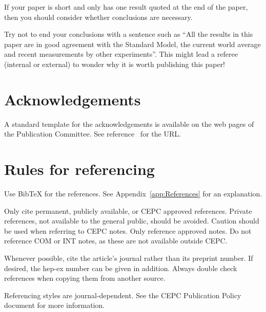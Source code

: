 \documentclass[11pt,a4paper]{cepcnote}
\newcommand{\BibTeX}{{\sc Bib\TeX}}
\begin{document}
If your paper is short and only has one result quoted at the end of
the paper, then you should consider whether conclusions are
necessary.

Try not to end your conclusions with a sentence such as
``All the results in this paper are in good agreement with the
Standard Model, the current world average and recent
measurements by other experiments''. This might lead a referee
(internal or external) to wonder why it is worth publishing this
paper!

%
%
\section{Acknowledgements}

A standard template for the acknowledgements is available on the
web pages of the Publication Committee.
See reference~\cite{publication_policy} for the URL.

%
%
\section{Rules for referencing}

Use \BibTeX{} for the references. See Appendix~\ref{app:References}
for an explanation.

Only cite permanent, publicly available, or CEPC approved references.
Private references, not available to the general public, should be
avoided. Caution should be used when referring to CEPC notes.
Only reference approved notes. Do not reference COM or INT notes,
as these are not available outside CEPC.

Whenever possible, cite the article's journal rather than its
preprint number. If desired, the hep-ex number can be given in
addition. Always double check references when copying them from
another source.

Referencing styles are journal-dependent. See the CEPC Publication
Policy document for more information.

\end{document}
